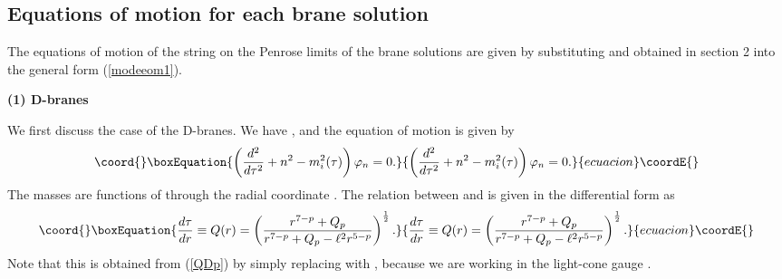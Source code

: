 \documentclass[a4paper,12pt]{article}
\begin{document}
\subsection{Equations of motion for each brane solution}
The equations of motion of the string on the Penrose limits
of the brane solutions are given by substituting 
\coordHE{} and \coordHE{} obtained in section 2 
into the general form (\ref{modeeom1}).
\medskip

\noindent
{\bf (1) D\coordHE{}-branes}
\medskip

\noindent
We first discuss the case of the D\coordHE{}-branes.
We have \coordHE{}, and the equation
of motion is given by
\begin{equation}\coord{}\boxEquation{
\left({d^2\over d\tau^2}+n^{2}-m_{i}^2(\tau) \right)\varphi_{n}=0.
\label{DE1}
}{
\left({d^2\over d\tau^2}+n^{2}-m_{i}^2(\tau) \right)\varphi_{n}=0.
}{ecuacion}\coordE{}\end{equation}
The masses  \coordHE{}
are functions of \myHighlight{$\tau$}\coordHE{} through the radial coordinate \coordHE{}.
The relation between \coordHE{} and \myHighlight{$\tau$}\coordHE{} is given in the
differential form as 
\begin{equation}\coord{}\boxEquation{ 
{d\tau\over dr}\equiv Q(r)=\left({r^{7-p}+Q_{p}\over 
r^{7-p}+Q_{p}-\ell^2 r^{5-p}}\right)^{1\over2}.
\label{eq:QrDp}
}{ 
{d\tau\over dr}\equiv Q(r)=\left({r^{7-p}+Q_{p}\over 
r^{7-p}+Q_{p}-\ell^2 r^{5-p}}\right)^{1\over2}.
}{ecuacion}\coordE{}\end{equation}
Note that this is obtained from (\ref{QDp}) by
simply replacing \coordHE{} with \myHighlight{$\tau$}\coordHE{}, because we are working 
in the light-cone gauge \coordHE{}.
\end{document}
